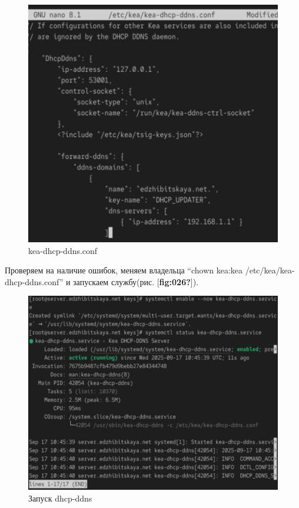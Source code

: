 \documentclass[
  english,
  russian,
  12pt,
  a4paper,
  DIV=11,
  numbers=noendperiod]{scrreprt}
\begin{document}
\begin{figure}

{\centering \includegraphics[width=0.7\linewidth,height=\textheight,keepaspectratio]{image/25.jpg}

}

\caption{kea-dhcp-ddns.conf}

\end{figure}%

Проверяем на наличие ошибок, меняем владельца ``chown kea:kea
/etc/kea/kea-dhcp-ddns.conf'' и запускаем службу(рис.
{[}\textbf{fig:026?}{]}).

\begin{figure}

{\centering \includegraphics[width=0.7\linewidth,height=\textheight,keepaspectratio]{image/26.jpg}

}

\caption{Запуск dhcp-ddns}

\end{figure}%
\end{document}
